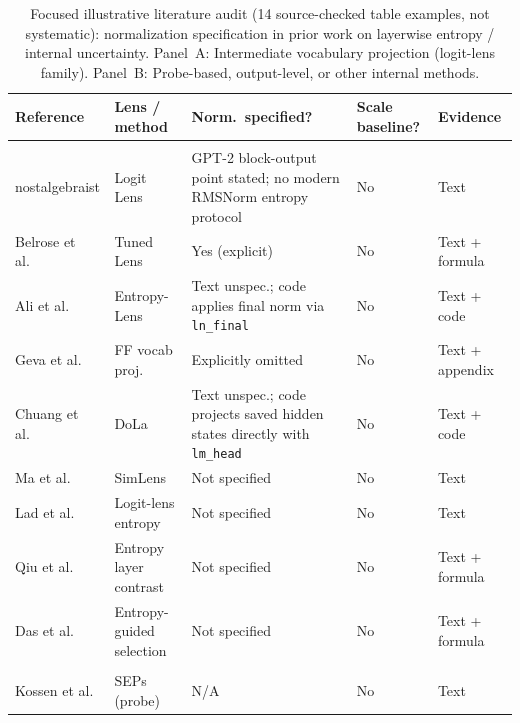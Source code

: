 \documentclass{ieeeaccess}
\begin{document}
\FloatBarrier
\begin{table}[!t]
\centering
\caption{Focused illustrative literature audit (14 source-checked table examples, not systematic): normalization specification in prior work on layerwise entropy / internal uncertainty. Panel~A: Intermediate vocabulary projection (logit-lens family). Panel~B: Probe-based, output-level, or other internal methods.}
\label{tab:litaudit}
\footnotesize
\setlength{\tabcolsep}{2pt}
\begin{tabular}{>{\raggedright\arraybackslash}p{} >{\raggedright\arraybackslash}p{} >{\raggedright\arraybackslash}p{} >{\raggedright\arraybackslash}p{} >{\raggedright\arraybackslash}p{}}
\toprule
Reference & Lens / method & Norm.\ specified? & Scale baseline? & Evidence \\
\midrule
\multicolumn{5}{l}{\textit{Panel A. Intermediate vocabulary projection (logit-lens family)}} \\
\midrule
nostalgebraist \cite{nostalgebraist2020logitlens} & Logit Lens & GPT-2 block-output point stated; no modern RMSNorm entropy protocol & No & Text \\
Belrose et al.\ \cite{belrose2023tuned} & Tuned Lens & Yes (explicit) & No & Text + formula \\
Ali et al.\ \cite{ali2025entropylens} & Entropy-Lens & Text unspec.; code applies final norm via \texttt{ln\_final} & No & Text + code \\
Geva et al.\ \cite{geva2022transformer} & FF vocab proj. & Explicitly omitted & No & Text + appendix \\
Chuang et al.\ \cite{chuang2024dola} & DoLa & Text unspec.; code projects saved hidden states directly with \texttt{lm\_head} & No & Text + code \\
Ma et al.\ \cite{ma2025simlens} & SimLens & Not specified & No & Text \\
Lad et al.\ \cite{lad2024robustness} & Logit-lens entropy & Not specified & No & Text \\
Qiu et al.\ \cite{qiu2025entropy} & Entropy layer contrast & Not specified & No & Text + formula \\
Das et al.\ \cite{das2025entropy} & Entropy-guided selection & Not specified & No & Text + formula \\
\midrule
\multicolumn{5}{l}{\textit{Panel B. Probe-based, output-level, or other internal methods}} \\
\midrule
Kossen et al.\ \cite{kossen2024seps} & SEPs (probe) & N/A & No & Text \\

\end{tabular}
\end{table}
\end{document}
